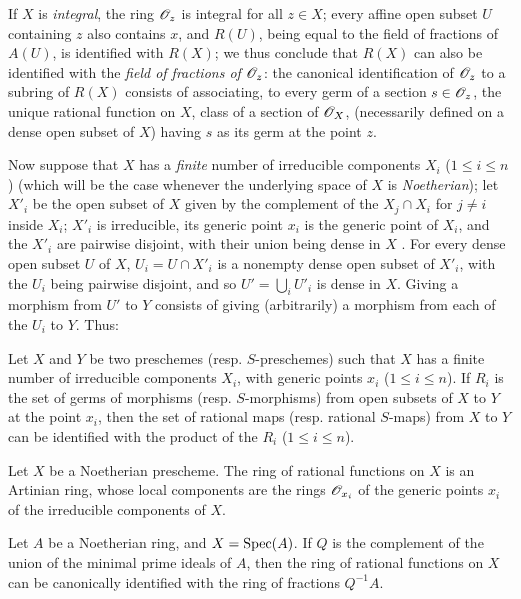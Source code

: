 If $X$ is \emph{integral}, the ring $\mathscr{O}_z$ is integral for all $z\in X$; every affine open subset $U$ containing $z$ also contains $x$, and $R(U)$, being equal to the field of fractions of $A(U)$, is identified with $R(X)$; we thus conclude that $R(X)$ can also be identified with the \emph{field of fractions of $\mathscr{O}_z$}: the canonical identification of $\mathscr{O}_z$ to a subring of $R(X)$ consists of associating, to every germ of a section $s\in\mathscr{O}_z$, the unique rational function on $X$, class of a section of $\mathscr{O}_X$, (necessarily defined on a dense open subset of $X$) having $s$ as its germ at the point $z$.

\begin{env}[7.1.6]
\label{1.7.1.6}
Now suppose that $X$ has a \emph{finite} number of irreducible components $X_i$ ($1\leq i\leq n$) (which will be the case whenever the underlying space of $X$ is \emph{Noetherian}); let $X'_i$ be the open subset of $X$ given by the complement of the $X_j\cap X_i$ for $j\neq i$ inside $X_i$; $X'_i$ is irreducible, its generic point $x_i$ is the generic point of $X_i$, and the $X'_i$ are pairwise disjoint, with their union being dense in $X$ .
For every dense open subset $U$ of $X$, $U_i=U\cap X'_i$ is a nonempty dense open subset of $X'_i$, with the $U_i$ being pairwise disjoint, and so $U'=\bigcup_i U'_i$ is dense in $X$.
Giving a morphism from $U'$ to $Y$ consists of giving (arbitrarily) a morphism from each of the $U_i$ to $Y$.
Thus:
\end{env}

\begin{prop}[7.1.7]
\label{1.7.1.7}
Let $X$ and $Y$ be two preschemes (resp. $S$-preschemes) such that $X$ has a finite number of irreducible components $X_i$, with generic points $x_i$ ($1\leq i\leq n$).
If $R_i$ is the set of germs of morphisms (resp. $S$-morphisms) from open subsets of $X$ to $Y$ at the point $x_i$, then the set of rational maps (resp. rational $S$-maps) from $X$ to $Y$ can be identified with the product of the $R_i$ ($1\leq i\leq n$).
\end{prop}

\begin{cor}[7.1.8]
\label{1.7.1.8}
Let $X$ be a Noetherian prescheme.
The ring of rational functions on $X$ is an Artinian ring, whose local components are the rings $\mathscr{O}_{x_i}$ of the generic points $x_i$ of the irreducible components of $X$.
\end{cor}

\begin{cor}[7.1.9]
\label{1.7.1.9}
Let $A$ be a Noetherian ring, and $X={\mathop{\mathrm{Spec}}\nolimits}(A)$.
If $Q$ is the complement of the union of the minimal prime ideals of $A$, then the ring of rational functions on $X$ can be canonically identified with the ring of fractions $Q^{-1}A$.
\end{cor}

